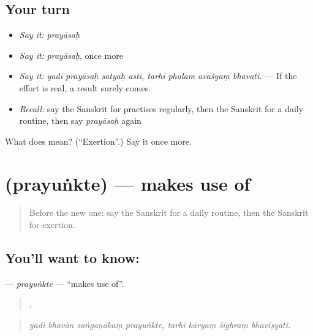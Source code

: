 \subsection*{Your turn}
\begin{itemize}
\raggedright
  \item \emph{Say it:} \emph{prayāsaḥ}
  \item \emph{Say it:} \emph{prayāsaḥ}, once more
  \item \emph{Say it:} \emph{yadi prayāsaḥ satyaḥ asti, tarhi phalam avaśyaṃ bhavati.} — If the effort is real, a result surely comes.
  \item \emph{Recall:} say the Sanskrit for practises regularly, then the Sanskrit for a daily routine, then say \emph{prayāsaḥ} again
\end{itemize}

\begin{tcolorbox}[breakable,colback=teal!4,colframe=teal!35!black,title={Before you move on}]
What does  mean? (\textquotedblleft{}Exertion\textquotedblright{}.) Say it once more.
\end{tcolorbox}
\section[\texorpdfstring{\sk{प्रयुंक्ते} (prayuṅkte)}{प्रयुंक्ते (prayuṅkte)}]{ (prayuṅkte) — makes use of}

\label{lesson:SA-C552-prayunkte}



\begin{quote}
Before the new one: say the Sanskrit for a daily routine, then the Sanskrit for exertion.
\end{quote}

\subsection*{You'll want to know: }
\textbf{} — \emph{prayuṅkte} — \textquotedblleft{}makes use of\textquotedblright{}.

\begin{quote}
   ,    
\end{quote}

\begin{quote}
\emph{yadi bhavān saṅgaṇakaṃ prayuṅkte, tarhi kāryaṃ śīghraṃ bhaviṣyati.}
\end{quote}

